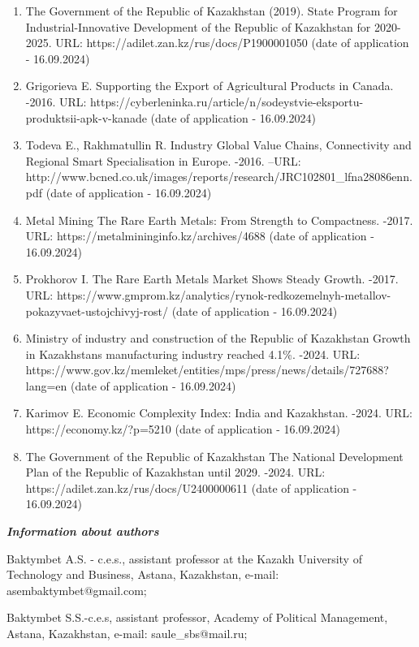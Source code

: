 \begin{enumerate}
\def\labelenumi{\arabic{enumi}.}
\item
  The Government of the Republic of Kazakhstan (2019). State Program for
  Industrial-Innovative Development of the Republic of Kazakhstan for
  2020-2025. URL: https://adilet.zan.kz/rus/docs/P1900001050 (date of
  application - 16.09.2024)
\item
  Grigorieva E. Supporting the Export of Agricultural Products in
  Canada. -2016. URL:
  https://cyberleninka.ru/article/n/sodeystvie-eksportu-produktsii-apk-v-kanade
  (date of application - 16.09.2024)
\item
  Todeva E., Rakhmatullin R. Industry Global Value Chains, Connectivity
  and Regional Smart Specialisation in Europe. -2016. --URL:
  http://www.bcned.co.uk/images/reports/research/JRC102801\_lfna28086enn.pdf
  (date of application - 16.09.2024)
\item
  Metal Mining The Rare Earth Metals: From Strength to Compactness.
  -2017. URL: https://metalmininginfo.kz/archives/4688 (date of
  application - 16.09.2024)
\item
  Prokhorov I. The Rare Earth Metals Market Shows Steady Growth. -2017.
  URL:
  https://www.gmprom.kz/analytics/rynok-redkozemelnyh-metallov-pokazyvaet-ustojchivyj-rost/
  (date of application - 16.09.2024)
\item
  Ministry of industry and construction of the Republic of Kazakhstan
  Growth in Kazakhstan\textquotesingle s manufacturing industry reached
  4.1\%. -2024. URL:
  https://www.gov.kz/memleket/entities/mps/press/news/details/727688?lang=en
  (date of application - 16.09.2024)
\item
  Karimov E. Economic Complexity Index: India and Kazakhstan. -2024.
  URL: https://economy.kz/?p=5210 (date of application - 16.09.2024)
\item
  The Government of the Republic of Kazakhstan The National Development
  Plan of the Republic of Kazakhstan until 2029. -2024. URL:
  https://adilet.zan.kz/rus/docs/U2400000611 (date of application -
  16.09.2024)
\end{enumerate}

\emph{{\bfseries Information about authors}}

Baktymbet A.S. - c.e.s., assistant professor at the Kazakh University of
Technology and Business, Astana, Kazakhstan, e-mail:
asembaktymbet@gmail.com;

Baktymbet S.S.-c.e.s, assistant professor, Academy of Political
Management, Astana, Kazakhstan, e-mail: saule\_sbs@mail.ru;

